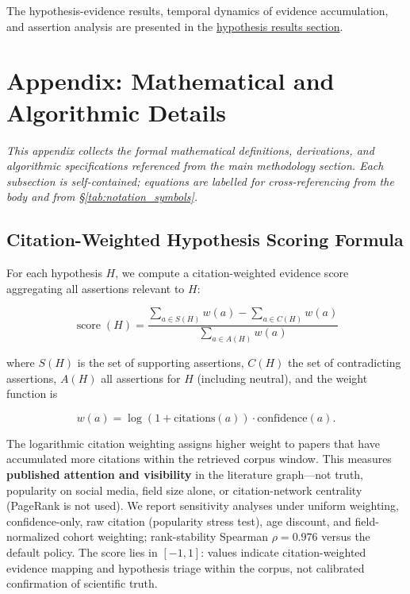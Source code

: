 \documentclass[
  english,
]{article}
\newcommand{\score}{\operatorname{score}}
\begin{document}
The hypothesis-evidence results, temporal dynamics of evidence
accumulation, and assertion analysis are presented in the
\hyperref[sec:hypothesis_results]{hypothesis results section}.

\newpage

\section{Appendix: Mathematical and Algorithmic
Details}\label{sec:technical_appendix}

\emph{This appendix collects the formal mathematical definitions,
derivations, and algorithmic specifications referenced from the main
methodology section. Each subsection is self-contained; equations are
labelled for cross-referencing from the body and from
\S\ref{tab:notation_symbols}.}

\subsection{Citation-Weighted Hypothesis Scoring
Formula}\label{sec:appendix_scoring}

For each hypothesis \(H\), we compute a citation-weighted evidence score
aggregating all assertions relevant to \(H\):

\begin{equation}
\score(H) = \frac{\sum_{a \in S(H)} w(a) - \sum_{a \in C(H)} w(a)}{\sum_{a \in A(H)} w(a)} \label{eq:app_score}
\end{equation}

where \(S(H)\) is the set of supporting assertions, \(C(H)\) the set of
contradicting assertions, \(A(H)\) all assertions for \(H\) (including
neutral), and the weight function is

\begin{equation}
w(a) = \log(1 + \text{citations}(a)) \cdot \text{confidence}(a). \label{eq:app_weight}
\end{equation}

The logarithmic citation weighting assigns higher weight to papers that
have accumulated more citations within the retrieved corpus window. This
measures \textbf{published attention and visibility} in the literature
graph---not truth, popularity on social media, field size alone, or
citation-network centrality (PageRank is not used). We report
sensitivity analyses under uniform weighting, confidence-only, raw
citation (popularity stress test), age discount, and field-normalized
cohort weighting; rank-stability Spearman \(\rho = 0.976\) versus the
default policy. The score lies in \([-1, 1]\): values indicate
citation-weighted evidence mapping and hypothesis triage within the
corpus, not calibrated confirmation of scientific truth.
\end{document}
